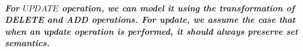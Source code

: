 \subparagraph*{\textnormal{For $\mathit{UPDATE}$ operation, we can model it using the transformation of DELETE and ADD operations. For update, we assume the case that when an update operation is performed, it should always preserve set semantics.}}

